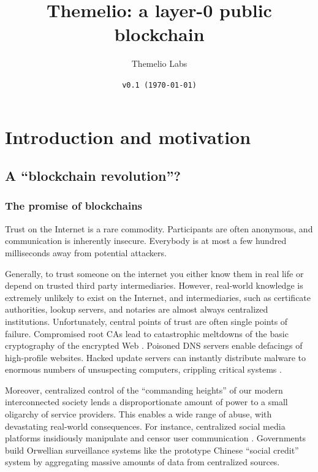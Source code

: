 \documentclass[headinclude]{scrbook}
\begin{document}
\raggedbottom
\title{Themelio: a layer-0 public blockchain}
\author{\textsf{Themelio Labs}}
\date{\texttt{v0.1 (\today)}}
\maketitle



\tableofcontents


\chapter{Introduction and motivation}

\section{A ``blockchain revolution''?}

\subsection{The promise of blockchains}

Trust on the Internet is a rare commodity. Participants are often anonymous, and communication is inherently insecure. Everybody is at most a few hundred milliseconds away from potential attackers.

Generally, to trust someone on the internet you either know them in real life or depend on trusted third party intermediaries. However, real-world knowledge is extremely unlikely to exist on the Internet, and intermediaries, such as certificate authorities, lookup servers, and notaries are almost always centralized institutions. Unfortunately, central points of trust are often single points of failure. Compromised root CAs lead to catastrophic meltdowns of the basic cryptography of the encrypted Web \cite{prins2011diginotar}. Poisoned DNS servers enable defacings of high-profile websites. Hacked update servers can instantly distribute malware to enormous numbers of unsuspecting computers, crippling critical systems \cite{richardson2017ransomware}.

Moreover, centralized control of the ``commanding heights'' of our modern interconnected society lends a disproportionate amount of power to a small oligarchy of service providers. This enables a wide range of abuse, with devastating real-world consequences. For instance, centralized social media platforms insidiously manipulate and censor user communication \cite{sunstein2018republic}. Governments build Orwellian surveillance systems like the prototype Chinese ``social credit'' system \cite{wang11china} by aggregating massive amounts of data from centralized sources.
\end{document}
